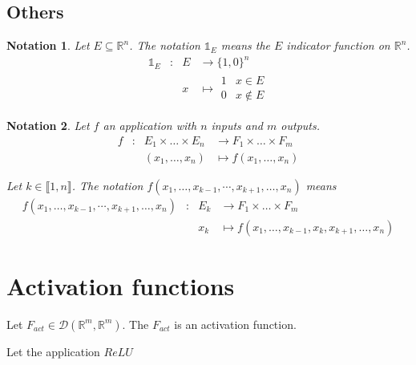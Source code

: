 \documentclass[11pt,en]{elegantpaper}
\newtheorem{notation}{Notation}
\begin{document}
\subsection{Others}
 
\begin{notation}
  Let $E \subseteq \mathbb{R}^n$. The notation $\mathbb{1}_E$ means the $E$ indicator function on $\mathbb{R}^n$.
  \begin{equation*}
    \begin{array}{llll}
      \mathbb{1}_E & : & E & \longrightarrow \{1,0\}^n \\
      &   & x & \longmapsto \begin{array}{ll}
        1 & x \in E \\
        0 & x \notin E
      \end{array}
    \end{array}
  \end{equation*}
\end{notation}

\begin{notation}
  Let $f$ an application with $n$ inputs and $m$ outputs.
  \begin{equation*}
    \begin{array}{llll}
      f & : & E_1 \times \ldots \times E_n & \longrightarrow F_1 \times \ldots \times F_m \\
      &   & (x_1, \ldots, x_n) & \longmapsto f(x_1, \ldots, x_n)
    \end{array}
  \end{equation*} \par

  Let $k \in \llbracket 1,n \rrbracket$. The notation $f(x_1, \ldots, x_{k-1}, \cdots, x_{k+1}, \ldots, x_n)$ means \begin{equation*}
    \begin{array}{llll}
      f(x_1, \ldots, x_{k-1}, \cdots, x_{k+1}, \ldots, x_n) & : & E_k & \longrightarrow F_1 \times \ldots \times F_m \\
      &   & x_k & \longmapsto f(x_1, \ldots, x_{k-1}, x_k, x_{k+1}, \ldots, x_n)
    \end{array}
  \end{equation*}
\end{notation}

\section{Activation functions}

\begin{definition}
  Let $F_{act} \in \mathcal{D}(\mathbb{R}^m,\mathbb{R}^m)$. The $F_{act}$ is an activation function.
\end{definition}

\begin{definition}
  Let the application $ReLU$ 
\end{definition}
\end{document}
